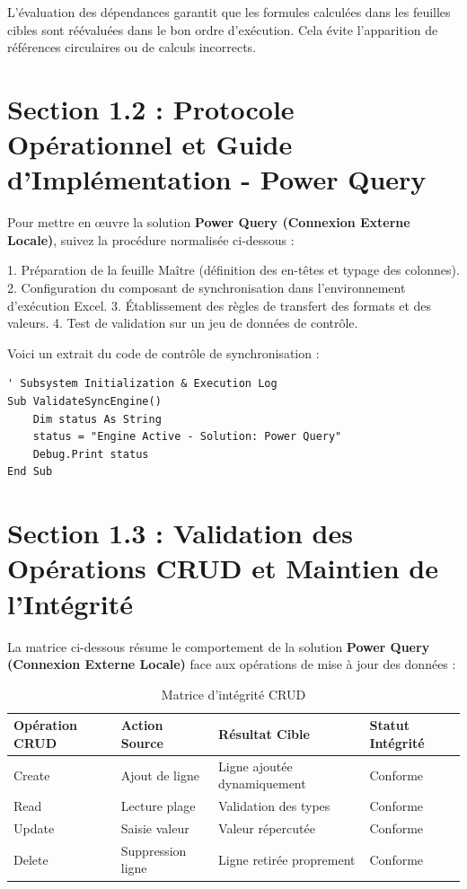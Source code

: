 \documentclass[12pt,a4paper]{report}
\begin{document}
L'évaluation des dépendances garantit que les formules calculées dans les feuilles cibles sont réévaluées dans le bon ordre d'exécution. Cela évite l'apparition de références circulaires ou de calculs incorrects.


\section{Section 1.2 : Protocole Opérationnel et Guide d'Implémentation - Power Query}
Pour mettre en œuvre la solution \textbf{Power Query (Connexion Externe Locale)}, suivez la procédure normalisée ci-dessous :

1. Préparation de la feuille Maître (définition des en-têtes et typage des colonnes).
2. Configuration du composant de synchronisation dans l'environnement d'exécution Excel.
3. Établissement des règles de transfert des formats et des valeurs.
4. Test de validation sur un jeu de données de contrôle.

Voici un extrait du code de contrôle de synchronisation :
\begin{lstlisting}[caption=Code de controle operationnel]
' Subsystem Initialization & Execution Log
Sub ValidateSyncEngine()
    Dim status As String
    status = "Engine Active - Solution: Power Query"
    Debug.Print status
End Sub
\end{lstlisting}


\section{Section 1.3 : Validation des Opérations CRUD et Maintien de l'Intégrité}
La matrice ci-dessous résume le comportement de la solution \textbf{Power Query (Connexion Externe Locale)} face aux opérations de mise à jour des données :

\begin{table}[h]
\centering
\begin{tabular}{@{}llll@{}}
\toprule
\textbf{Opération CRUD} & \textbf{Action Source} & \textbf{Résultat Cible} & \textbf{Statut Intégrité} \\ \midrule
Create & Ajout de ligne & Ligne ajoutée dynamiquement & Conforme \\
Read & Lecture plage & Validation des types & Conforme \\
Update & Saisie valeur & Valeur répercutée & Conforme \\
Delete & Suppression ligne & Ligne retirée proprement & Conforme \\ \bottomrule
\end{tabular}
\caption{Matrice d'intégrité CRUD}
\end{table}
\end{document}
